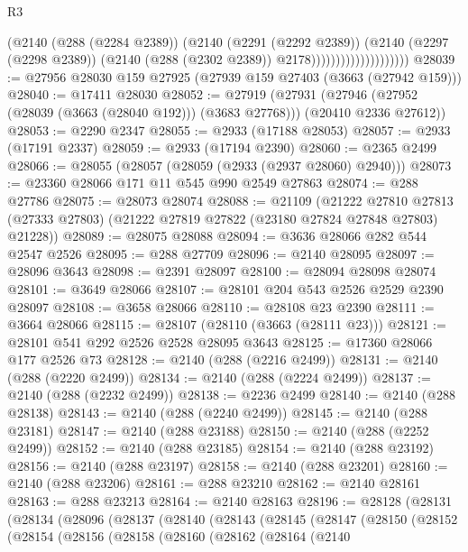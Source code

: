\begin{lexlean}{R3}
\begin{coremodule}
                                    (@2140
                                      (@288 (@2284 @2389))
                                      (@2140
                                        (@2291 (@2292 @2389))
                                        (@2140
                                          (@2297 (@2298 @2389))
                                          (@2140 (@288 (@2302 @2389)) @2178))))))))))))))))))))
@28039 := @27956 @28030 @159 @27925 (@27939 @159 @27403 (@3663 (@27942 @159)))
@28040 := @17411 @28030
@28052 := @27919
    (@27931 (@27946 (@27952 (@28039 (@3663 (@28040 @192))) (@3683 @27768))) (@20410 @2336 @27612))
@28053 := @2290 @2347
@28055 := @2933 (@17188 @28053)
@28057 := @2933 (@17191 @2337)
@28059 := @2933 (@17194 @2390)
@28060 := @2365 @2499
@28066 := @28055 (@28057 (@28059 (@2933 (@2937 @28060) @2940)))
@28073 := @23360 @28066 @171 @11 @545 @990 @2549 @27863
@28074 := @288 @27786
@28075 := @28073 @28074
@28088 := @21109
    (@21222
      @27810
      @27813
      (@27333 @27803)
      (@21222 @27819 @27822 (@23180 @27824 @27848 @27803) @21228))
@28089 := @28075 @28088
@28094 := @3636 @28066 @282 @544 @2547 @2526
@28095 := @288 @27709
@28096 := @2140 @28095
@28097 := @28096 @3643
@28098 := @2391 @28097
@28100 := @28094 @28098 @28074
@28101 := @3649 @28066
@28107 := @28101 @204 @543 @2526 @2529 @2390 @28097
@28108 := @3658 @28066
@28110 := @28108 @23 @2390
@28111 := @3664 @28066
@28115 := @28107 (@28110 (@3663 (@28111 @23)))
@28121 := @28101 @541 @292 @2526 @2528 @28095 @3643
@28125 := @17360 @28066 @177 @2526 @73
@28128 := @2140 (@288 (@2216 @2499))
@28131 := @2140 (@288 (@2220 @2499))
@28134 := @2140 (@288 (@2224 @2499))
@28137 := @2140 (@288 (@2232 @2499))
@28138 := @2236 @2499
@28140 := @2140 (@288 @28138)
@28143 := @2140 (@288 (@2240 @2499))
@28145 := @2140 (@288 @23181)
@28147 := @2140 (@288 @23188)
@28150 := @2140 (@288 (@2252 @2499))
@28152 := @2140 (@288 @23185)
@28154 := @2140 (@288 @23192)
@28156 := @2140 (@288 @23197)
@28158 := @2140 (@288 @23201)
@28160 := @2140 (@288 @23206)
@28161 := @288 @23210
@28162 := @2140 @28161
@28163 := @288 @23213
@28164 := @2140 @28163
@28196 := @28128
    (@28131
      (@28134
        (@28096
          (@28137
            (@28140
              (@28143
                (@28145
                  (@28147
                    (@28150
                      (@28152
                        (@28154
                          (@28156
                            (@28158
                              (@28160
                                (@28162
                                  (@28164
                                    (@2140

\end{coremodule}
\end{lexlean}
